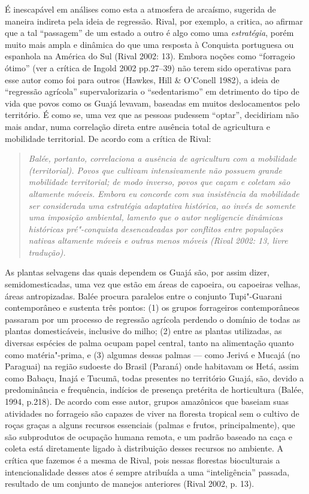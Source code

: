 É inescapável em análises como esta a atmosfera de arcaísmo, sugerida de
maneira indireta pela ideia de regressão. Rival, por exemplo, a critica,
ao afirmar que a tal ``passagem'' de um estado a outro é algo como uma
\emph{estratégia}, porém muito mais ampla e dinâmica do que uma resposta
à Conquista portuguesa ou espanhola na América do Sul (Rival 2002: 13).
Embora noções como ``forrageio ótimo'' (ver a crítica de Ingold 2002
pp.27--39) não terem sido operativas para esse autor como foi para outros
(Hawkes, Hill \& O'Conell 1982), a ideia de ``regressão agrícola''
supervalorizaria o ``sedentarismo'' em detrimento do tipo de vida que
povos como os Guajá levavam, baseadas em muitos deslocamentos pelo
território. É como se, uma vez que as pessoas pudessem ``optar'',
decidiriam não mais andar, numa correlação direta entre ausência total
de agricultura e mobilidade territorial. De acordo com a crítica de
Rival:

\begin{quote}
\emph{Balée, portanto, correlaciona a ausência de agricultura com a
mobilidade (territorial). Povos que cultivam intensivamente não possuem
grande mobilidade territorial; de modo inverso, povos que caçam e
coletam são altamente móveis. Embora eu concorde com sua insistência da
mobilidade ser considerada uma estratégia adaptativa histórica, ao invés
de somente uma imposição ambiental, lamento que o autor negligencie
dinâmicas históricas pré"-conquista desencadeadas por conflitos entre
populações nativas altamente móveis e outras menos móveis (Rival 2002:
13, livre tradução).}
\end{quote}

As plantas selvagens das quais dependem os Guajá são, por assim dizer,
semidomesticadas, uma vez que estão em áreas de capoeira, ou capoeiras
velhas, áreas antropizadas. Balée procura paralelos entre o conjunto
Tupi"-Guarani contemporâneo e sustenta três pontos: (1) os grupos 
forrageiros contemporâneos passaram por um processo de regressão
agrícola perdendo o domínio de todas as plantas domesticáveis, inclusive
do milho; (2) entre as plantas utilizadas, as diversas espécies de palma
ocupam papel central, tanto na alimentação quanto como matéria"-prima, e
(3) algumas dessas palmas --- como Jerivá e Mucajá (no Paraguai) na região
sudoeste do Brasil (Paraná) onde habitavam os Hetá, assim como Babaçu,
Inajá e Tucumã, todas presentes no território Guajá, são, devido a
predominância e frequência, indícios de presença pretérita de
horticultura (Balée, 1994, p.218). De acordo com esse autor, grupos
amazônicos que baseiam suas atividades no forrageio são capazes de viver
na floresta tropical sem o cultivo de roças graças a alguns recursos
essenciais (palmas e frutos, principalmente), que são subprodutos de
ocupação humana remota, e um padrão baseado na caça e coleta está
diretamente ligado à distribuição desses recursos no ambiente. A crítica
que fazemos é a mesma de Rival, pois nessas florestas bioculturais a
intencionalidade desses atos é sempre atribuída a uma ``inteligência''
passada, resultado de um conjunto de manejos anteriores (Rival 2002, p.
13).

